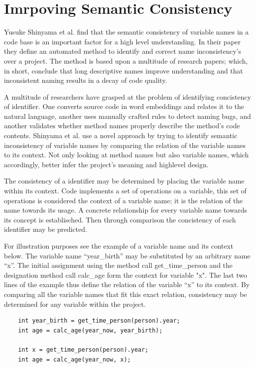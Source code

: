 \documentclass[a4paper,12pt]{article}
\begin{document}
\newpage

\section{Imrpoving Semantic Consistency}
Yusuke Shinyama et al. find that the semantic consistency of variable names in a code base is an important factor for a high level understanding. In their paper they define an automated method to identify and correct name inconsistency’s over a project. The method is based upon a multitude of research papers; which, in short, conclude that long descriptive names improve understanding and that inconsistent naming results in a decay of code quality.

A multitude of researchers have grasped at the problem of identifying concistency of identifier. One converts source code in word embeddings and relates it to the natural language, another uses manually crafted rules to detect naming bugs, and another validates whether method names properly describe the method’s code contents. Shinyama et al. use a novel approach by trying to identify semantic inconsistency of variable names by comparing the relation of the variable names to its context. Not only looking at method names but also variable names, which accordingly, better infer the project’s meaning and highlevel design.

The consistency of a identifier may be determined by placing the variable name within its context. Code implements a set of operations on a variable, this set of operations is considered the context of a variable name; it is the relation of the name towards its usage. A concrete relationship for every variable name towards its concept is establisched. Then through comparison the concistency of each identifier may be predicted. 

For illustration purposes see the example of a variable name and its context below. The variable name “year\_birth” may be substituted by an arbitrary name “x”. The initial assignment using the method call get\_time\_person and the designation method call calc\_age form the context for variable "x". The last two lines of the example thus define the relation of the variable “x” to its context. By comparing all the variable names that fit this exact relation, consistency may be determined for any variable within the project.

\begin{verbatim}
    int year_birth = get_time_person(person).year;
    int age = calc_age(year_now, year_birth);

    int x = get_time_person(person).year;
    int age = calc_age(year_now, x);
\end{verbatim}
\end{document}
